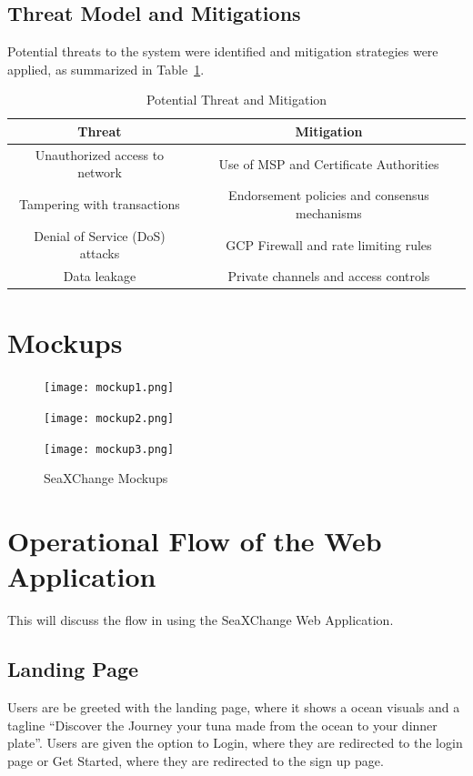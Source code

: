 \subsection{Threat Model and Mitigations}
Potential threats to the system were identified and mitigation strategies were applied, as summarized in Table~\ref{tab:threat}.
\begin{table}[h]
	\centering
	\begin{tabular}{|c|c|}
		\hline
		\textbf{Threat} & \textbf{Mitigation} \\
		\hline
		Unauthorized access to network & Use of MSP and Certificate Authorities \\
		\hline
		Tampering with transactions & Endorsement policies and consensus mechanisms \\
		\hline
		Denial of Service (DoS) attacks & GCP Firewall and rate limiting rules \\
		\hline
		Data leakage & Private channels and access controls \\
		\hline
	\end{tabular}
	\caption{Potential Threat and Mitigation}
	\label{tab:threat}
\end{table}


\section{Mockups}
\begin{figure}[H]
	\centering
	\texttt{[image: mockup1.png]}
	
	\vspace{20pt} %
	
	\texttt{[image: mockup2.png]}
\end{figure}

\clearpage %


\begin{figure}[H]
	\centering
	\texttt{[image: mockup3.png]}
	\caption{SeaXChange Mockups}
	\label{fig:eight_step}
\end{figure}


\section{Operational Flow of the Web Application}
This will discuss the flow in using the SeaXChange Web Application.

\subsection{Landing Page}
Users are be greeted with the landing page, where it shows a ocean visuals and a tagline “Discover the Journey your tuna made from the ocean to your dinner plate”. Users are given the option to Login, where they are redirected to the login page or Get Started, where they are redirected to the sign up page. 

